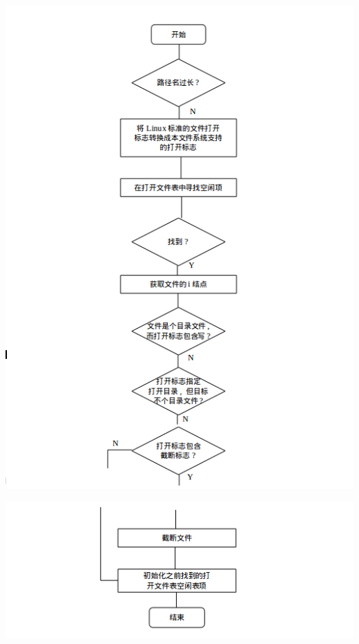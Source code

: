 \documentclass[nofonts]{ctexart}
\begin{document}
\begin{itemize}
  \includegraphics[width=15cm]{./images/./open_1.png}

  \includegraphics[width=15cm]{./images/./open_2.png}
  \end{itemize}
\end{document}
